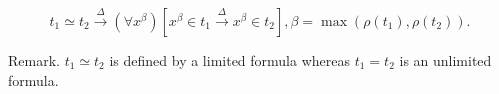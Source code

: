 $$t_1 \simeq t_2 \xrightarrow{\Delta} (\forall x^\beta)[x^\beta \in t_1 \xrightarrow{\Delta} x^\beta \in t_2], \beta = \max(\rho(t_1), \rho(t_2)).$$

Remark. $t_1 \simeq t_2$ is defined by a limited formula whereas $t_1 = t_2$ is an unlimited formula.

